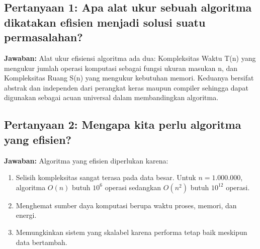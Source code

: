 \subsection*{Pertanyaan 1: Apa alat ukur sebuah algoritma dikatakan efisien menjadi solusi suatu permasalahan?}

\textbf{Jawaban:} Alat ukur efisiensi algoritma ada dua: Kompleksitas Waktu T(n) yang mengukur jumlah operasi komputasi sebagai fungsi ukuran masukan n, dan Kompleksitas Ruang S(n) yang mengukur kebutuhan memori. Keduanya bersifat abstrak dan independen dari perangkat keras maupun compiler sehingga dapat digunakan sebagai acuan universal dalam membandingkan algoritma.

\subsection*{Pertanyaan 2: Mengapa kita perlu algoritma yang efisien?}

\textbf{Jawaban:} Algoritma yang efisien diperlukan karena:
\begin{enumerate}
    \item Selisih kompleksitas sangat terasa pada data besar. Untuk $n = 1.000.000$, algoritma $O(n)$ butuh $10^6$ operasi sedangkan $O(n^2)$ butuh $10^{12}$ operasi.
    \item Menghemat sumber daya komputasi berupa waktu proses, memori, dan energi.
    \item Memungkinkan sistem yang skalabel karena performa tetap baik meskipun data bertambah.
\end{enumerate}

